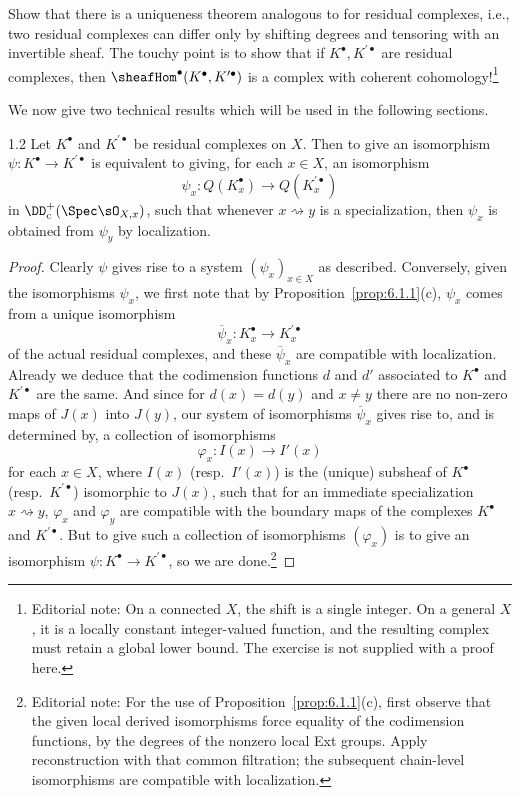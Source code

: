\begin{exercise*}
Show that there is a uniqueness theorem analogous to  for residual complexes, i.e., two residual complexes can differ only by shifting degrees and tensoring with an invertible sheaf. The touchy point is to show that if $K^{\bullet}, K^{\prime\bullet}$ are residual complexes, then $\sheafHom^{\bullet}(K^{\bullet}, K^{\prime\bullet})$ is a complex with coherent cohomology!\footnote{Editorial note: On a connected $X$, the shift is a single integer. On a general $X$, it is a locally constant integer-valued function, and the resulting complex must retain a global lower bound. The exercise is not supplied with a proof here.}

\end{exercise*}

We now give two technical results which will be used in the following sections.

\begin{booklemma}{1.2}\label{lem:6.1.2}
Let $K^\bullet$ and $K^{\prime\bullet}$ be residual complexes on $X$. Then to give an isomorphism $\psi\colon K^\bullet\to K^{\prime\bullet}$ is equivalent to giving, for each $x\in X$, an isomorphism
\[
\psi_x\colon Q(K_x^\bullet)\longrightarrow Q(K_x^{\prime\bullet})
\]
in $\DD_{\mathrm{c}}^+(\Spec\sO_{X,x})$, such that whenever $x\rightsquigarrow y$ is a specialization, then $\psi_x$ is obtained from $\psi_y$ by localization.
\end{booklemma}

\begin{proof}
Clearly $\psi$ gives rise to a system $(\psi_x)_{x\in X}$ as described. Conversely, given the isomorphisms $\psi_x$, we first note that by Proposition~\ref{prop:6.1.1}(c), $\psi_x$ comes from a unique isomorphism
\[
\overline{\psi}_x\colon K_x^\bullet\longrightarrow K_x^{\prime\bullet}
\]
of the actual residual complexes, and these $\overline{\psi}_x$ are compatible with localization. Already we deduce that the codimension functions $d$ and $d'$ associated to $K^\bullet$ and $K^{\prime\bullet}$ are the same. And since for $d(x)=d(y)$ and $x\neq y$ there are no non-zero maps of $J(x)$ into $J(y)$, our system of isomorphisms $\overline{\psi}_x$ gives rise to, and is determined by, a collection of isomorphisms
\[
\varphi_x\colon I(x)\longrightarrow I'(x)
\]
for each $x\in X$, where $I(x)$ (resp.\ $I'(x)$) is the (unique) subsheaf of $K^\bullet$ (resp.\ $K^{\prime\bullet}$) isomorphic to $J(x)$, such that for an immediate specialization $x\rightsquigarrow y$, $\varphi_x$ and $\varphi_y$ are compatible with the boundary maps of the complexes $K^\bullet$ and $K^{\prime\bullet}$. But to give such a collection of isomorphisms $(\varphi_x)$ is to give an isomorphism $\psi\colon K^\bullet\to K^{\prime\bullet}$, so we are done.\footnote{Editorial note: For the use of Proposition~\ref{prop:6.1.1}(c), first observe that the given local derived isomorphisms force equality of the codimension functions, by the degrees of the nonzero local Ext groups. Apply reconstruction with that common filtration; the subsequent chain-level isomorphisms are compatible with localization.}
\end{proof}

